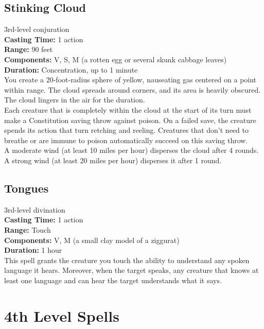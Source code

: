 \documentclass[11pt, A4paper, english]{article}
\begin{document}
		\subsection{Stinking Cloud}
3rd-level conjuration \\
\textbf{Casting Time:} 1 action \\
\textbf{Range:} 90 feet \\
\textbf{Components:} V, S, M (a rotten egg or several skunk cabbage leaves) \\
\textbf{Duration:} Concentration, up to 1 minute \\
You create a 20-foot-radius sphere of yellow, nauseating gas centered on a point within range. The cloud spreads around corners, and its area is heavily obscured. The cloud lingers in the air for the duration. \\
Each creature that is completely within the cloud at the start of its turn must make a Constitution saving throw against poison. On a failed save, the creature spends its action that turn retching and reeling. Creatures that don’t need to breathe or are immune to poison automatically succeed on this saving throw. \\
A moderate wind (at least 10 miles per hour) disperses the cloud after 4 rounds. A strong wind (at least 20 miles per hour) disperses it after 1 round.

		\subsection{Tongues}
3rd-level divination \\
\textbf{Casting Time:} 1 action \\
\textbf{Range:} Touch \\
\textbf{Components:} V, M (a small clay model of a ziggurat) \\
\textbf{Duration:} 1 hour \\
This spell grants the creature you touch the ability to understand any spoken language it hears. Moreover, when the target speaks, any creature that knows at least one language and can hear the target understands what it says.



	\section{4th Level Spells}
\end{document}
